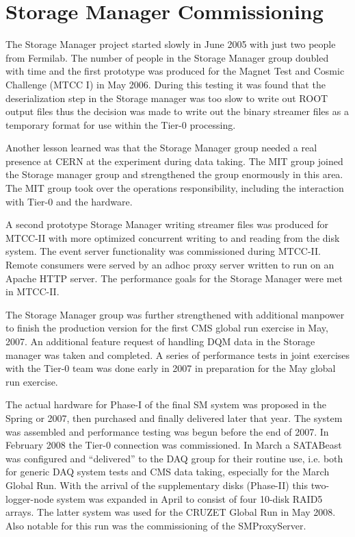 



\section{Storage Manager Commissioning}


The Storage Manager project started slowly in June 2005 with just two people
from Fermilab. The number of people in the Storage Manager group doubled with time
and the first prototype was produced for the Magnet Test and Cosmic Challenge (MTCC I)
in May 2006.
During this testing it was found that the deserialization step in the Storage manager was
too slow to write out ROOT output  files thus the decision was made to write out
the binary streamer files as a temporary format for use within the Tier-0 processing.

Another lesson learned was that the Storage Manager group needed a real presence
at CERN at the experiment during data taking. The MIT group joined the Storage manager
group and strengthened the group enormously in this area. 
The MIT group took over the operations
responsibility, including the interaction with Tier-0 and the hardware.

A second prototype Storage Manager writing streamer files was produced for MTCC-II
with more optimized concurrent writing to and reading from the disk system. The event
server functionality was commissioned during MTCC-II. Remote consumers were
served by an adhoc proxy server written to run on an Apache HTTP server.
The performance goals for the Storage Manager were met in MTCC-II.

The Storage Manager group was further strengthened with additional manpower
to finish the production version for the first CMS global run exercise in May, 2007.
An additional feature request of handling DQM data in the Storage manager was
taken and completed.
A series of performance tests in joint exercises with the Tier-0 team was done early in 2007
in preparation for the May global run exercise.


The actual hardware for Phase-I of the final SM system was proposed in the Spring or 2007,
then purchased and finally delivered later that year.
The system was assembled and performance testing was begun before the end of 2007. 
In February 2008 the Tier-0 connection was commissioned.
In March a SATABeast was configured
and ``delivered'' to the DAQ group for their routine use,
i.e. both for generic DAQ system tests and CMS data taking, especially for the March Global Run.
With the  arrival of the supplementary disks (Phase-II) this two-logger-node system 
was expanded in April to consist of four  10-disk RAID5 arrays.
The latter system was used for  the CRUZET Global Run in May 2008.
Also notable for this run was the commissioning of the  SMProxyServer. 



